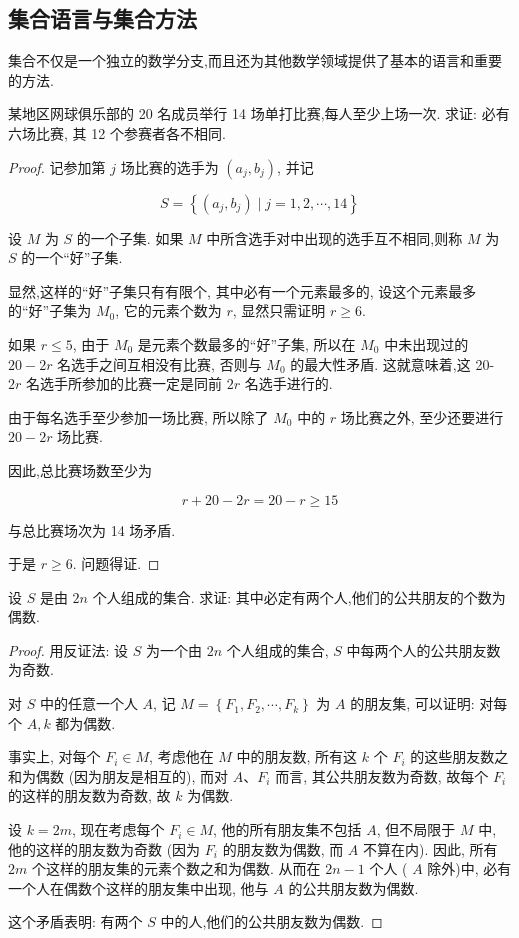 \subsection{集合语言与集合方法}
集合不仅是一个独立的数学分支,而且还为其他数学领域提供了基本的语言和重要的方法.
\begin{example}
	某地区网球俱乐部的 20 名成员举行 14 场单打比赛,每人至少上场一次. 求证: 必有六场比赛, 其 12 个参赛者各不相同.
\end{example}
\begin{proof}
	记参加第 $j$ 场比赛的选手为 $\left(a_{j}, b_{j}\right)$, 并记

	$$
		S=\left\{\left(a_{j}, b_{j}\right) \mid j=1,2, \cdots, 14\right\}
	$$

	设 $M$ 为 $S$ 的一个子集. 如果 $M$ 中所含选手对中出现的选手互不相同,则称 $M$ 为 $S$ 的一个“好”子集.

	显然,这样的“好”子集只有有限个, 其中必有一个元素最多的, 设这个元素最多的“好”子集为 $M_{0}$, 它的元素个数为 $r$, 显然只需证明 $r \geqslant 6$.

	如果 $r \leqslant 5$, 由于 $M_{0}$ 是元素个数最多的“好”子集, 所以在 $M_{0}$ 中未出现过的 $20-2 r$ 名选手之间互相没有比赛, 否则与 $M_{0}$ 的最大性矛盾. 这就意味着,这 20- $2 r$ 名选手所参加的比赛一定是同前 $2 r$ 名选手进行的.

	由于每名选手至少参加一场比赛, 所以除了 $M_{0}$ 中的 $r$ 场比赛之外, 至少还要进行 $20-2 r$ 场比赛.

	因此,总比赛场数至少为

	$$
		r+20-2 r=20-r \geqslant 15
	$$

	与总比赛场次为 14 场矛盾.

	于是 $r \geqslant 6$. 问题得证.
\end{proof}

\begin{example}
	设 $S$ 是由 $2 n$ 个人组成的集合. 求证: 其中必定有两个人,他们的公共朋友的个数为偶数.
\end{example}
\begin{proof}
	用反证法: 设 $S$ 为一个由 $2 n$ 个人组成的集合, $S$ 中每两个人的公共朋友数为奇数.

	对 $S$ 中的任意一个人 $A$, 记 $M=\left\{F_{1}, F_{2}, \cdots, F_{k}\right\}$ 为 $A$ 的朋友集, 可以证明: 对每个 $A, k$ 都为偶数.

	事实上, 对每个 $F_{i} \in M$, 考虑他在 $M$ 中的朋友数, 所有这 $k$ 个 $F_{i}$ 的这些朋友数之和为偶数 (因为朋友是相互的), 而对 $A 、 F_{i}$ 而言, 其公共朋友数为奇数, 故每个 $F_{i}$ 的这样的朋友数为奇数, 故 $k$ 为偶数.

	设 $k=2 m$, 现在考虑每个 $F_{i} \in M$, 他的所有朋友集不包括 $A$, 但不局限于 $M$ 中, 他的这样的朋友数为奇数 (因为 $F_{i}$ 的朋友数为偶数, 而 $A$ 不算在内). 因此, 所有 $2 m$ 个这样的朋友集的元素个数之和为偶数. 从而在 $2 n-1$ 个人 ( $A$ 除外)中, 必有一个人在偶数个这样的朋友集中出现, 他与 $A$ 的公共朋友数为偶数.

	这个矛盾表明: 有两个 $S$ 中的人,他们的公共朋友数为偶数.
\end{proof}

